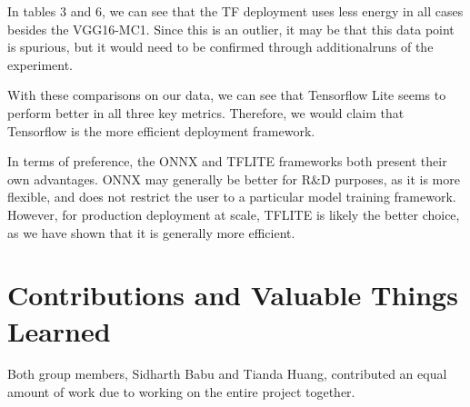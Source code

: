 \documentclass{article}
\begin{document}
In tables 3 and 6, we can see that the TF deployment uses less energy in all cases besides the VGG16-MC1. Since this is an outlier, it may be that this data point is spurious, but it would need to be confirmed through additionalruns of the experiment.

With these comparisons on our data, we can see that Tensorflow Lite seems to perform better in all three key metrics. Therefore, we would claim that Tensorflow is the more efficient deployment framework. 

In terms of preference, the ONNX and TFLITE frameworks both present their own advantages. ONNX may generally be better for R\&D purposes, as it is more flexible, and does not restrict the user to a particular model training framework. However, for production deployment at scale, TFLITE is likely the better choice, as we have shown that it is generally more efficient.


\section*{Contributions and Valuable Things Learned}
Both group members, Sidharth Babu and Tianda Huang, contributed an equal amount of work due to working on the entire project together.
\end{document}
